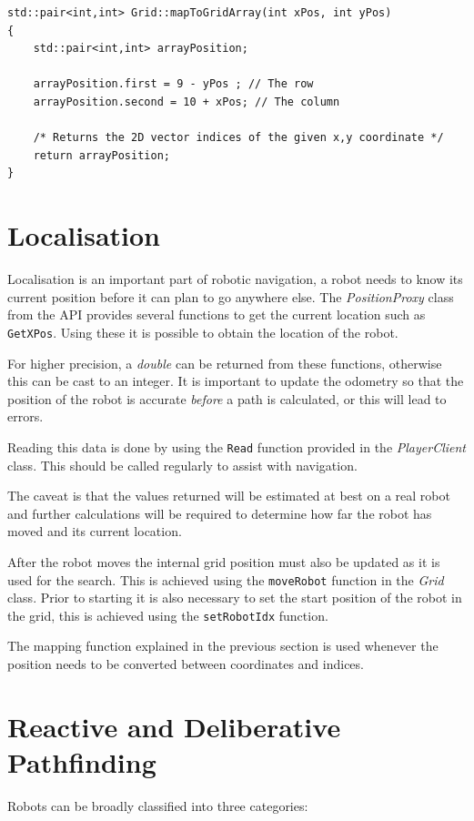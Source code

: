 \documentclass[a4paper,12pt]{article}
\begin{document}
\begin{lstlisting}
std::pair<int,int> Grid::mapToGridArray(int xPos, int yPos)
{
    std::pair<int,int> arrayPosition;

    arrayPosition.first = 9 - yPos ; // The row
    arrayPosition.second = 10 + xPos; // The column

    /* Returns the 2D vector indices of the given x,y coordinate */
    return arrayPosition; 
}
\end{lstlisting}
\section{Localisation}
Localisation is an important part of robotic navigation, a robot needs to know its current position before it can plan to go anywhere else. The \textit{PositionProxy} class from the API provides several functions to get the current location such as \texttt{GetXPos}. Using these it is possible to obtain the location of the robot.

For higher precision, a \textit{double} can be returned from these functions, otherwise this can be cast to an integer. It is important to update the odometry so that the position of the robot is accurate \textit{before} a path is calculated, or this will lead to errors. 

Reading this data is done by using the \texttt{Read} function provided in the \textit{PlayerClient} class. This should be called regularly to assist with navigation.

The caveat is that the values returned will be estimated at best on a real robot and further calculations will be required to determine how far the robot has moved and its current location.

After the robot moves the internal grid position must also be updated as it is used for the search. This is achieved using the \texttt{moveRobot} function in the \textit{Grid} class. Prior to starting it is also necessary to set the start position of the robot in the grid, this is achieved using the \texttt{setRobotIdx} function. 

The mapping function explained in the previous section is used whenever the position needs to be converted between coordinates and indices.
\section{Reactive and Deliberative Pathfinding}
Robots can be broadly classified into three categories:
\end{document}
